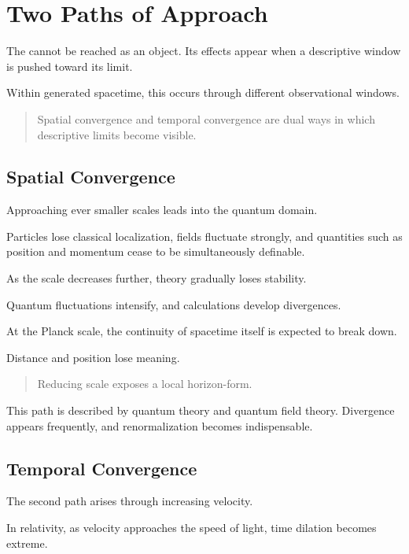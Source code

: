 \section{Two Paths of Approach}

\label{sec:two_modes}

The \DH{} cannot be reached as an object.
Its effects appear when a descriptive window is pushed toward
its limit.

Within generated spacetime,
this occurs through different observational windows.

\medskip
\begin{quote}
Spatial convergence and temporal convergence
are dual ways in which descriptive limits become visible.
\end{quote}
\medskip

\subsection{Spatial Convergence}

Approaching ever smaller scales leads into the quantum domain.

Particles lose classical localization,
fields fluctuate strongly,
and quantities such as position and momentum
cease to be simultaneously definable.

As the scale decreases further,
theory gradually loses stability.

Quantum fluctuations intensify,
and calculations develop divergences.

At the Planck scale,
the continuity of spacetime itself is expected to break down.

Distance and position lose meaning.

\medskip
\begin{quote}
Reducing scale exposes a local horizon-form.
\end{quote}
\medskip

This path is described by quantum theory and quantum field theory.
Divergence appears frequently,
and renormalization becomes indispensable.

\subsection{Temporal Convergence}

The second path arises through increasing velocity.

In relativity,
as velocity approaches the speed of light,
time dilation becomes extreme.

